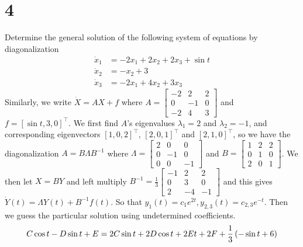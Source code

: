 \documentclass{article}
\begin{document}
\section*{4}
\begin{myleftlinebox}
    Determine the general solution of the following system of equations by diagonalization
    \begin{equation*}
        \begin{split}
            \dot x_1 &= -2x_1+2x_2+2x_3+\sin t\\
            \dot x_2 &= -x_2 + 3\\
            \dot x_3 &= -2x_1+4 x_2 + 3x_3
        \end{split}
    \end{equation*}
    \tcblower
    Similarly, we write \(\dot X = AX+f\) where \(A = \begin{bmatrix}
        -2 & 2 & 2\\
        0 & -1 & 0\\
        -2 & 4 & 3
    \end{bmatrix}\) and \(f=[\sin t,3,0]^\top\). We first find \(A\)'s eigenvalues \(\lambda_1 = 2\) and \(\lambda_2 = -1\), and corresponding eigenvectors \([1,0,2]^\top\), \([2,0,1]^\top\) and \([2,1,0]^\top\), so we have the diagonalization \(A = B\Lambda B^{-1}\) where \(\Lambda=\begin{bmatrix}
        2 & 0 & 0\\
        0 & -1 & 0\\
        0 & 0 & -1
    \end{bmatrix}\) and \(B = \begin{bmatrix}
        1 & 2 & 2\\
        0 & 1 & 0\\
        2 & 0 & 1
    \end{bmatrix}\). We then let \(X = BY\) and left multiply \(B^{-1}=\frac{1}{3}\begin{bmatrix}
        -1 & 2 & 2\\
        0 & 3 & 0\\
        2 & -4 & -1
    \end{bmatrix}\) and this gives \(\dot Y(t) = \Lambda Y(t) + B^{-1} f(t)\). So that \(y_1(t) = c_1 e^{2t}, y_{2,3}(t) = c_{2,3} e^{-t}\). Then we guess the particular solution using undetermined coefficients.
    \begin{equation*}
        \begin{split}
            C \cos t-D\sin t+E &= 2  C\sin t+2D\cos t+2E t+2F+\frac{1}{3}\Pare{-\sin t+6}\\

\end{split}
\end{equation*}
\end{myleftlinebox}
\end{document}
